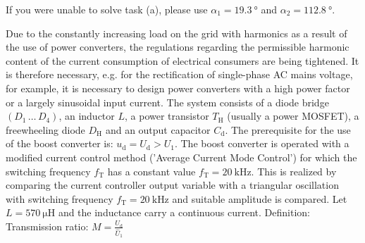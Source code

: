 \vspace{2em}\par
If you were unable to solve task (a), please use $\alpha_1=\SI{19.3}{\degree}$ and $\alpha_2=\SI{112.8}{\degree}$.








Due to the constantly increasing load on the grid with harmonics as a result of the use of power converters, the regulations regarding the permissible harmonic content of the current consumption of electrical consumers are being tightened. It is therefore necessary, e.g. for the rectification of single-phase AC mains voltage, for example, it is necessary to design power converters with a high power factor or a largely sinusoidal input current. The system consists of a diode bridge $(D_{\mathrm{1}} \, \dots \, D_{\mathrm{4}})$, an inductor $L$, a power transistor $T_\mathrm{H}$ (usually a power MOSFET), a freewheeling diode $D_\mathrm{H}$ and an output capacitor $C_\mathrm{d}$. The prerequisite for the use of the boost converter is: $u_\mathrm{d} = U_\mathrm{d}>U_\mathrm{1}$. The boost converter is operated with a modified current control method ('Average Current Mode Control') for which the switching frequency $f_\mathrm{T}$ has a constant value $f_\mathrm{T} = \SI{20}{\kilo\hertz}$. This is realized
by comparing the current controller output variable with a triangular oscillation with switching frequency $f_\mathrm{T} = \SI{20}{\kilo\hertz}$ and suitable amplitude is compared.
Let $L = \SI{570}{\micro\henry}$ and the inductance carry a continuous current.
Definition: Transmission ratio: $M = \frac{ U_\mathrm{d}}{\hat U_\mathrm{1}}$


